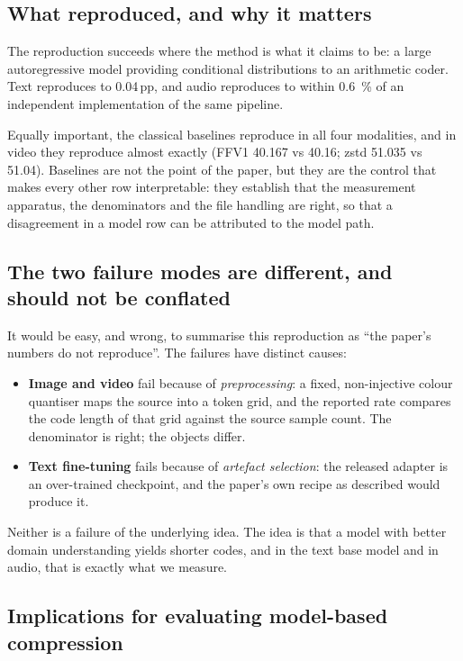 \documentclass[11pt,a4paper]{article}
\begin{document}
\subsection{What reproduced, and why it matters}

The reproduction succeeds where the method is what it claims to be: a large
autoregressive model providing conditional distributions to an arithmetic coder.
Text reproduces to \num{0.04}\,pp, and audio reproduces to within
\SI{0.6}{\%} of an independent implementation of the same pipeline.

Equally important, the classical baselines reproduce in all four modalities, and
in video they reproduce almost exactly (FFV1 \num{40.167} vs \num{40.16};
zstd \num{51.035} vs \num{51.04}). Baselines are not the point of the paper, but
they are the control that makes every other row interpretable: they establish that
the measurement apparatus, the denominators and the file handling are right, so
that a disagreement in a model row can be attributed to the model path.

\subsection{The two failure modes are different, and should not be conflated}

It would be easy, and wrong, to summarise this reproduction as ``the paper's
numbers do not reproduce''. The failures have distinct causes:

\begin{itemize}[leftmargin=1.4em,itemsep=2pt]
\item \textbf{Image and video} fail because of \emph{preprocessing}: a fixed,
      non-injective colour quantiser maps the source into a token grid, and the
      reported rate compares the code length of that grid against the source
      sample count. The denominator is right; the objects differ.
\item \textbf{Text fine-tuning} fails because of \emph{artefact selection}: the
      released adapter is an over-trained checkpoint, and the paper's own recipe
      as described would produce it.
\end{itemize}

Neither is a failure of the underlying idea. The idea is that a model with better
domain understanding yields shorter codes, and in the text base model and in
audio, that is exactly what we measure.

\subsection{Implications for evaluating model-based compression}
\end{document}
